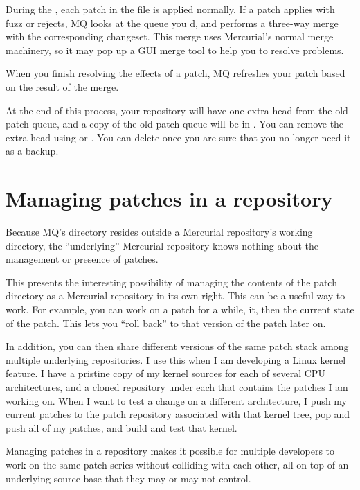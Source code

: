 During the , each patch in the
 file is applied normally.  If a patch applies with
fuzz or rejects, MQ looks at the queue you d, and
performs a three-way merge with the corresponding changeset.  This
merge uses Mercurial's normal merge machinery, so it may pop up a GUI
merge tool to help you to resolve problems.

When you finish resolving the effects of a patch, MQ refreshes your
patch based on the result of the merge.

At the end of this process, your repository will have one extra head
from the old patch queue, and a copy of the old patch queue will be in
. You can remove the extra head using
or .  You can delete  once
you are sure that you no longer need it as a backup.

\section{Managing patches in a repository}

Because MQ's  directory resides outside a
Mercurial repository's working directory, the ``underlying'' Mercurial
repository knows nothing about the management or presence of patches.

This presents the interesting possibility of managing the contents of
the patch directory as a Mercurial repository in its own right.  This
can be a useful way to work.  For example, you can work on a patch for
a while,  it, then  the current state of
the patch.  This lets you ``roll back'' to that version of the patch
later on.

In addition, you can then share different versions of the same patch
stack among multiple underlying repositories.  I use this when I am
developing a Linux kernel feature.  I have a pristine copy of my
kernel sources for each of several CPU architectures, and a cloned
repository under each that contains the patches I am working on.  When
I want to test a change on a different architecture, I push my current
patches to the patch repository associated with that kernel tree, pop
and push all of my patches, and build and test that kernel.

Managing patches in a repository makes it possible for multiple
developers to work on the same patch series without colliding with
each other, all on top of an underlying source base that they may or
may not control.

